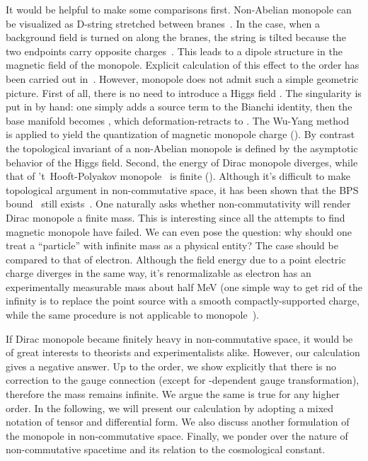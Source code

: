 \documentclass[a4paper,12pt]{article}
\begin{document}
It would be helpful to make some comparisons f\mbox{}irst. 
Non-Abelian monopole 
can be visualized as D-string stretched between 
branes~\cite{dl,dd}. In the \coordHE{} case, when a background \coordHE{} f\mbox{}ield 
is turned on along the branes, the string is tilted because the two
endpoints carry opposite charges~\cite{hh}. This leads to a dipole structure
in the magnetic f\mbox{}ield of the monopole. Explicit calculation of
this ef\mbox{}fect to the \coordHE{} order has been carried out 
in~\cite{hhm,db}.
However, \coordHE{} monopole does not admit such a simple geometric picture.
First of all, there is no need to introduce a Higgs f\mbox{}ield \myHighlight{$\phi$}\coordHE{}. The
singularity is put in by hand: one simply adds a source term to the Bianchi
identity, then the base manifold becomes \coordHE{}, which
deformation-retracts to \coordHE{}. The Wu-Yang method~\cite{wy} is applied
to yield the quantization of magnetic monopole charge 
(\coordHE{}). By contrast the topological invariant of a
non-Abelian monopole is def\mbox{}ined by the asymptotic behavior of the Higgs
f\mbox{}ield. Second, the energy of Dirac monopole diverges, while that of 
't~Hooft-Polyakov monopole~\cite{gh,ap} is f\mbox{}inite (\coordHE{}). 
Although it's dif\mbox{}f\mbox{}icult 
to make topological argument in non-commutative space, it has been shown
that the BPS bound~\cite{eb,ps} still exists~\cite{hh,hhm,db}. One naturally 
asks whether non-commutativity will render Dirac monopole a f\mbox{}inite mass.
This is interesting since all the attempts to f\mbox{}ind magnetic 
monopole have
failed. We can even pose the question: why should one treat a ``particle''
with inf\mbox{}inite mass as a physical entity? The case should be compared
to that of electron. Although the f\mbox{}ield energy due to a point 
electric charge diverges in the same way, it's renormalizable as electron
has an experimentally measurable mass about half MeV (one simple way to
get rid of the inf\mbox{}inity is to replace the point source with a smooth
compactly-supported charge, while the same procedure is not applicable
to monopole~\cite{jt}). 

If Dirac monopole became f\mbox{}initely heavy in
non-commutative space, it would be of great interests to theorists and
experimentalists alike. However, our calculation gives a negative answer. 
Up to the \coordHE{} order,
we show explicitly that there is no correction to the \coordHE{} gauge 
connection \coordHE{} (except for \myHighlight{$\theta$}\coordHE{}-dependent gauge transformation), 
therefore the mass remains inf\mbox{}inite. We
argue the same is true for any higher order. In the following, we will present
our calculation by adopting a mixed notation of tensor and dif\mbox{}ferential
form. We also discuss another formulation of the \coordHE{} monopole in
non-commutative space. Finally, we ponder over the nature of non-commutative
spacetime and its relation to the cosmological constant.
\end{document}
